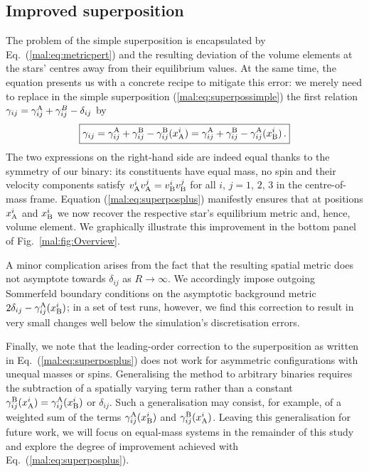\subsection{Improved superposition}
%
The problem of the simple superposition is encapsulated
by Eq.~(\ref{mal:eq:metricpert}) and the resulting deviation
of the volume elements at the stars' centres away from their
equilibrium values. At the same time, the equation presents us
with a concrete recipe to mitigate this error: we merely need
to replace in the simple superposition (\ref{mal:eq:superpossimple})
the first relation $\gamma_{ij}=\gamma_{ij}^{\rm A}+\gamma_{ij}^B
-\delta_{ij}$ by
%
\begin{equation}
  \boxed{
  \gamma_{ij}=\gamma_{ij}^{\rm A}+\gamma_{ij}^{\rm B}
  -\gamma_{ij}^{\rm B}(x^i_{\rm A})
  =\gamma_{ij}^{\rm A}+\gamma_{ij}^{\rm B}
  -\gamma_{ij}^{\rm A}(x^i_{\rm B})\,.}
  \label{mal:eq:superposplus}
\end{equation}
%
The two expressions on the right-hand side are indeed equal thanks
to the symmetry of our binary: its constituents have equal mass,
no spin and their velocity components satisfy
$v_{\rm A}^i v_{\rm A}^j=v_{\rm B}^i v_{\rm B}^j$ for all
$i,\,j=1,\,2,\,3$ in the centre-of-mass frame.
Equation (\ref{mal:eq:superposplus}) manifestly ensures that at
positions $x_{\rm A}^i$ and $x_{\rm B}^i$ we now recover
the respective star's equilibrium metric and, hence, volume element.
We graphically illustrate this improvement in the bottom panel
of Fig.~\ref{mal:fig:Overview}.

A minor complication arises from the fact that the resulting
spatial metric does not asymptote towards $\delta_{ij}$
as $R\rightarrow \infty$. We accordingly impose
outgoing Sommerfeld boundary conditions on the asymptotic
background metric $2\delta_{ij}-\gamma_{ij}^{\rm A}(x^i_{\rm B})$;
in a set of test runs, however, we find this correction to result
in very small changes well below the simulation's discretisation errors.

Finally, we note that the leading-order correction to the superposition
as written in Eq.~(\ref{mal:eq:superposplus}) does not work for asymmetric
configurations with unequal masses or spins. Generalising the method
to arbitrary binaries requires the subtraction of 
a spatially varying term rather than a constant
$\gamma_{ij}^{\rm B}(x^i_{\rm A})=\gamma_{ij}^{\rm A}(x^i_{\rm B})$
or $\delta_{ij}$. Such a generalisation may consist, for example,
of a weighted sum of the terms $\gamma_{ij}^{\rm A}(x^i_{\rm B})$
and $\gamma_{ij}^{\rm B}(x^i_{\rm A})$. Leaving this
generalisation for future work, we will focus on equal-mass
systems in the remainder of this study and explore
the degree of improvement achieved with
Eq.~(\ref{mal:eq:superposplus}).

